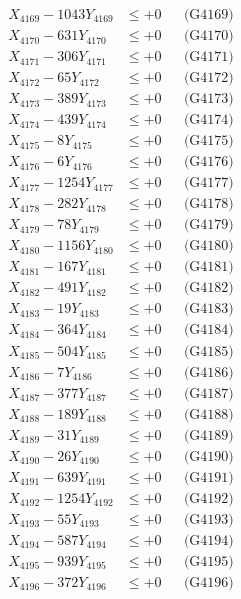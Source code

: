 \documentclass[a4paper,10pt]{article}
\begin{document}
{\begin{align}
X_{4169} - 1043Y_{4169} &\leq +0 && \text{(G4169)} \\
X_{4170} - 631Y_{4170} &\leq +0 && \text{(G4170)} \\
\allowbreak
X_{4171} - 306Y_{4171} &\leq +0 && \text{(G4171)} \\
X_{4172} - 65Y_{4172} &\leq +0 && \text{(G4172)} \\
X_{4173} - 389Y_{4173} &\leq +0 && \text{(G4173)} \\
X_{4174} - 439Y_{4174} &\leq +0 && \text{(G4174)} \\
X_{4175} - 8Y_{4175} &\leq +0 && \text{(G4175)} \\
X_{4176} - 6Y_{4176} &\leq +0 && \text{(G4176)} \\
X_{4177} - 1254Y_{4177} &\leq +0 && \text{(G4177)} \\
X_{4178} - 282Y_{4178} &\leq +0 && \text{(G4178)} \\
X_{4179} - 78Y_{4179} &\leq +0 && \text{(G4179)} \\
X_{4180} - 1156Y_{4180} &\leq +0 && \text{(G4180)} \\
\allowbreak
X_{4181} - 167Y_{4181} &\leq +0 && \text{(G4181)} \\
X_{4182} - 491Y_{4182} &\leq +0 && \text{(G4182)} \\
X_{4183} - 19Y_{4183} &\leq +0 && \text{(G4183)} \\
X_{4184} - 364Y_{4184} &\leq +0 && \text{(G4184)} \\
X_{4185} - 504Y_{4185} &\leq +0 && \text{(G4185)} \\
X_{4186} - 7Y_{4186} &\leq +0 && \text{(G4186)} \\
X_{4187} - 377Y_{4187} &\leq +0 && \text{(G4187)} \\
X_{4188} - 189Y_{4188} &\leq +0 && \text{(G4188)} \\
X_{4189} - 31Y_{4189} &\leq +0 && \text{(G4189)} \\
X_{4190} - 26Y_{4190} &\leq +0 && \text{(G4190)} \\
\allowbreak
X_{4191} - 639Y_{4191} &\leq +0 && \text{(G4191)} \\
X_{4192} - 1254Y_{4192} &\leq +0 && \text{(G4192)} \\
X_{4193} - 55Y_{4193} &\leq +0 && \text{(G4193)} \\
X_{4194} - 587Y_{4194} &\leq +0 && \text{(G4194)} \\
X_{4195} - 939Y_{4195} &\leq +0 && \text{(G4195)} \\
X_{4196} - 372Y_{4196} &\leq +0 && \text{(G4196)} \\

\end{align}}
\end{document}
